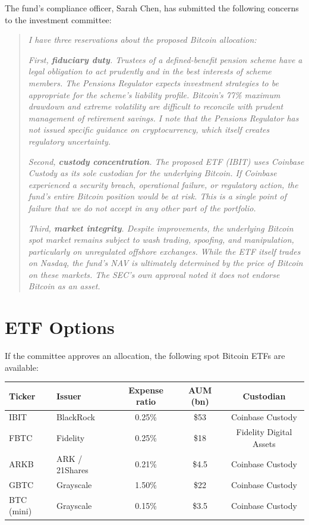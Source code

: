 \documentclass[11pt]{article}
\begin{document}
The fund's compliance officer, Sarah Chen, has submitted the following concerns to the investment committee:

\begin{quote}
\textit{I have three reservations about the proposed Bitcoin allocation:}

\textit{First, \textbf{fiduciary duty}. Trustees of a defined-benefit pension scheme have a legal obligation to act prudently and in the best interests of scheme members. The Pensions Regulator expects investment strategies to be appropriate for the scheme's liability profile. Bitcoin's 77\% maximum drawdown and extreme volatility are difficult to reconcile with prudent management of retirement savings. I note that the Pensions Regulator has not issued specific guidance on cryptocurrency, which itself creates regulatory uncertainty.}

\textit{Second, \textbf{custody concentration}. The proposed ETF (IBIT) uses Coinbase Custody as its sole custodian for the underlying Bitcoin. If Coinbase experienced a security breach, operational failure, or regulatory action, the fund's entire Bitcoin position would be at risk. This is a single point of failure that we do not accept in any other part of the portfolio.}

\textit{Third, \textbf{market integrity}. Despite improvements, the underlying Bitcoin spot market remains subject to wash trading, spoofing, and manipulation, particularly on unregulated offshore exchanges. While the ETF itself trades on Nasdaq, the fund's NAV is ultimately determined by the price of Bitcoin on these markets. The SEC's own approval noted it does not endorse Bitcoin as an asset.}
\end{quote}

\section*{ETF Options}

If the committee approves an allocation, the following spot Bitcoin ETFs are available:

\begin{center}
\small
\begin{tabular}{llccc}
\toprule
\textbf{Ticker} & \textbf{Issuer} & \textbf{Expense ratio} & \textbf{AUM (bn)} & \textbf{Custodian} \\
\midrule
IBIT & BlackRock & 0.25\% & \$53 & Coinbase Custody \\
FBTC & Fidelity & 0.25\% & \$18 & Fidelity Digital Assets \\
ARKB & ARK / 21Shares & 0.21\% & \$4.5 & Coinbase Custody \\
GBTC & Grayscale & 1.50\% & \$22 & Coinbase Custody \\
BTC (mini) & Grayscale & 0.15\% & \$3.5 & Coinbase Custody \\
\bottomrule
\end{tabular}
\end{center}
\end{document}
